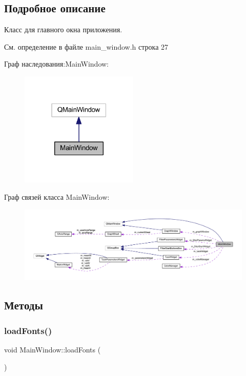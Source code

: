 \subsection{Подробное описание}
Класс для главного окна приложения. 

См. определение в файле main\+\_\+window.\+h строка 27



Граф наследования\+:Main\+Window\+:\nopagebreak
\begin{figure}[H]
\begin{center}
\leavevmode
\includegraphics[width=159pt]{class_main_window__inherit__graph}
\end{center}
\end{figure}


Граф связей класса Main\+Window\+:\nopagebreak
\begin{figure}[H]
\begin{center}
\leavevmode
\includegraphics[width=350pt]{class_main_window__coll__graph}
\end{center}
\end{figure}


\subsection{Методы}
\hypertarget{class_main_window_af0898886d5a3e9c0b336312e959daae6}{}\label{class_main_window_af0898886d5a3e9c0b336312e959daae6} 
\subsubsection{\texorpdfstring{load\+Fonts()}{loadFonts()}}
{\footnotesize\ttfamily void Main\+Window\+::load\+Fonts (\begin{DoxyParamCaption}{ }\end{DoxyParamCaption})\hspace{0.3cm}{\ttfamily [private]}}



